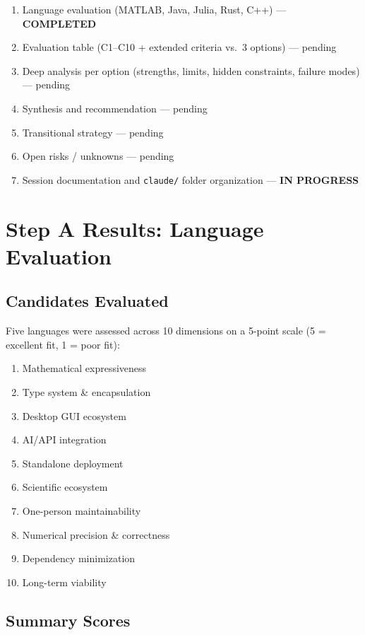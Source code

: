 \documentclass[11pt,a4paper]{article}
\begin{document}
\begin{enumerate}[label=\textbf{Step~\Alph*:}]
    \item Language evaluation (MATLAB, Java, Julia, Rust, C++) --- \textbf{COMPLETED}
    \item Evaluation table (C1--C10 + extended criteria vs.\ 3 options) --- pending
    \item Deep analysis per option (strengths, limits, hidden constraints, failure modes) --- pending
    \item Synthesis and recommendation --- pending
    \item Transitional strategy --- pending
    \item Open risks / unknowns --- pending
    \item Session documentation and \texttt{claude/} folder organization --- \textbf{IN PROGRESS}
\end{enumerate}

\section{Step A Results: Language Evaluation}

\subsection{Candidates Evaluated}

Five languages were assessed across 10 dimensions on a 5-point scale (5 = excellent fit, 1 = poor fit):

\begin{enumerate}
    \item Mathematical expressiveness
    \item Type system \& encapsulation
    \item Desktop GUI ecosystem
    \item AI/API integration
    \item Standalone deployment
    \item Scientific ecosystem
    \item One-person maintainability
    \item Numerical precision \& correctness
    \item Dependency minimization
    \item Long-term viability
\end{enumerate}

\subsection{Summary Scores}
\end{document}
